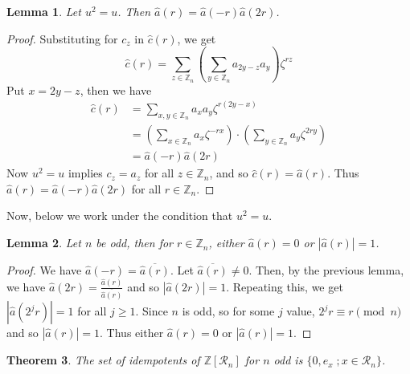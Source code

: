 \documentclass[10pt,twoside,reqno]{amsart}
\newtheorem{theorem}{Theorem}[section]
\newtheorem{lemma}[theorem]{Lemma}
\theoremstyle{definition}
\numberwithin{equation}{section}
\begin{document}
\begin{lemma}\label{idemeq}
Let $u^2=u$. Then $\hat{a}(r)=\hat{a}(-r)\hat{a}(2r)$.
\end{lemma}

\begin{proof}
Substituting for $c_z$ in $\hat{c}(r)$, we get
\[ \hat{c}(r)=\sum\limits_{z\in \mathbb Z_n} \left( \sum\limits_{y\in \mathbb Z_n}a_{2y-z}a_y \right) \zeta^{rz}\]
Put $x=2y-z$, then we have
\begin{align*}
\hat{c}(r)&=\sum\limits_{x,y\in \mathbb Z_n}a_xa_y \zeta^{r(2y-x)}\\
&= \left( \sum\limits_{x\in \mathbb Z_n}a_x\zeta^{-rx}  \right) \cdot \left( \sum\limits_{y\in \mathbb Z_n}a_y \zeta^{2ry} \right)\\
&= \hat{a}(-r)\hat{a}(2r)
\end{align*}
Now $u^2=u$ implies $c_z=a_z$ for all $z\in \mathbb Z_n$, and so $\hat{c}(r)=\hat{a}(r)$. Thus $\hat{a}(r)=\hat{a}(-r)\hat{a}(2r)$ for all $r\in \mathbb Z_n$.
\end{proof}

Now, below we work under the condition that $u^2=u$.
\begin{lemma} \label{abval}
Let $n$ be odd, then for $r \in \mathbb Z_n$, either $\hat{a}(r)=0$ or $|\hat{a}(r)|=1$.
\end{lemma}


\begin{proof}
We have $\hat{a}(-r)=\overline{\hat{a}(r)}$. Let $\overline{\hat{a}(r)} \neq 0$. Then, by the previous lemma, we have $\hat{a}(2r)=\frac{\hat{a}(r)}{\overline{\hat{a}(r)}}$ and so $|\hat{a}(2r)|=1$. Repeating this, we get $|\hat{a}(2^jr)|=1$ for all $j\geq 1$. Since $n$ is odd, so for some $j$ value, $2^jr\equiv r \pmod n$ and so $|\hat{a}(r)|=1$. Thus either $\hat{a}(r)=0$ or $|\hat{a}(r)|=1$.
\end{proof}

\begin{theorem}
The set of idempotents of $\mathbb Z[\mathcal R_n]$ for $n$ odd is $\{0,e_x\;; x\in \mathcal R_n\}$.
\end{theorem}
\end{document}
